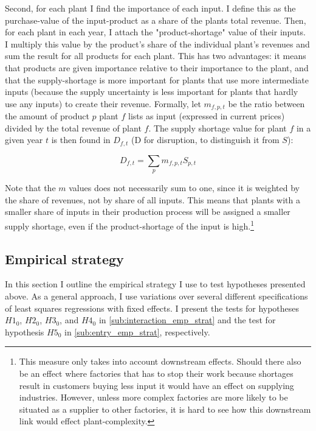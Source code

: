 \documentclass[11pt]{article}
\begin{document}
Second, for each plant I find the importance of each input. I define this as the purchase-value of the input-product as a share of the plants total revenue. Then, for each plant in each year, I attach the "product-shortage" value of their inputs. I multiply this value by the product's share of the individual plant's revenues and sum the result for all products for each plant. This has two advantages: it means that products are given importance relative to their importance to the plant, and that the supply-shortage is more important for plants that use more intermediate inputs (because the supply uncertainty is less important for plants that hardly use any inputs) to create their revenue. Formally, let $m_{f,p,t}$ be the ratio between the amount of product $p$ plant $f$ lists as input (expressed in current prices) divided by the total revenue of plant $f$. The supply shortage value for plant $f$ in a given year $t$ is then found in $D_{f,t}$ (D for disruption, to distinguish it from $S$):

\[
D_{f,t} = \sum_p m_{f,p,t} S_{p,t}
\]

Note that the $m$ values does not necessarily sum to one, since it is weighted by the share of revenues, not by share of all inputs. This means that plants with a smaller share of inputs in their production process will be assigned a smaller supply shortage, even if the product-shortage of the input is high.\footnote{This measure only takes into account downstream effects. Should there also be an effect where factories that has to stop their work because shortages result in customers buying less input it would have an effect on supplying industries. However, unless more complex factories are more likely to be situated as a supplier to other factories, it is hard to see how this downstream link would effect plant-complexity.}

\subsection{Empirical strategy}
\label{sec:emp_strat}

In this section I outline the empirical strategy I use to test hypotheses presented above. As a general approach, I use variations over several different specifications of least squares regressions with fixed effects. I present the tests for hypotheses $H1_0$, $H2_0$, $H3_0$, and $H4_0$ in \ref{sub:interaction_emp_strat} and the test for hypothesis $H5_0$ in \ref{sub:entry_emp_strat}, respectively.
\end{document}
